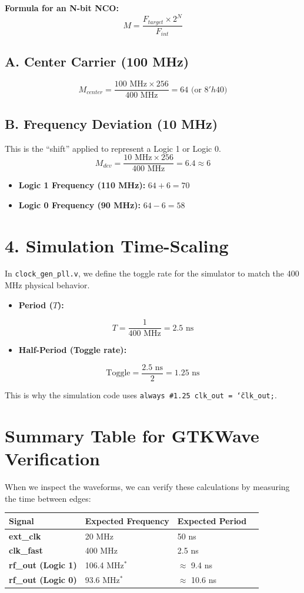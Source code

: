 \documentclass[12pt]{article}
\begin{document}
\vspace{0.5em}
\noindent \textbf{Formula for an N-bit NCO:}
\[ M = \frac{F_{target} \times 2^N}{F_{int}} \]

\subsection*{A. Center Carrier (100 MHz)}
\[ M_{center} = \frac{100 \text{ MHz} \times 256}{400 \text{ MHz}} = 64 \text{ (or } 8'h40\text{)} \]

\subsection*{B. Frequency Deviation (10 MHz)}
This is the ``shift'' applied to represent a Logic 1 or Logic 0.
\[ M_{dev} = \frac{10 \text{ MHz} \times 256}{400 \text{ MHz}} = 6.4 \approx 6 \]

\begin{itemize}
    \item \textbf{Logic 1 Frequency (110 MHz):} $64 + 6 = 70$
    \item \textbf{Logic 0 Frequency (90 MHz):} $64 - 6 = 58$
\end{itemize}

\section*{4. Simulation Time-Scaling}
In \texttt{clock\_gen\_pll.v}, we define the toggle rate for the simulator to match the 400 MHz physical behavior.
\begin{itemize}
    \item \textbf{Period ($T$):}
\end{itemize}
\[ T = \frac{1}{400 \text{ MHz}} = 2.5 \text{ ns} \]

\begin{itemize}
    \item \textbf{Half-Period (Toggle rate):}
\end{itemize}
\[ \text{Toggle} = \frac{2.5 \text{ ns}}{2} = 1.25 \text{ ns} \]

\noindent This is why the simulation code uses \texttt{always \#1.25 clk\_out = \char`\~clk\_out;}.

\section*{Summary Table for GTKWave Verification}
When we inspect the waveforms, we can verify these calculations by measuring the time between edges:

\vspace{1em}
\noindent
\begin{tabular}{@{}lllr@{}}
\toprule
\textbf{Signal} & \textbf{Expected Frequency} & \textbf{Expected Period} \\ \midrule
\textbf{ext\_clk} & 20 MHz & 50 ns \\
\textbf{clk\_fast} & 400 MHz & 2.5 ns \\
\textbf{rf\_out (Logic 1)} & 106.4 MHz$^*$ & $\approx$ 9.4 ns \\
\textbf{rf\_out (Logic 0)} & 93.6 MHz$^*$ & $\approx$ 10.6 ns \\ \bottomrule
\end{tabular}
\end{document}
